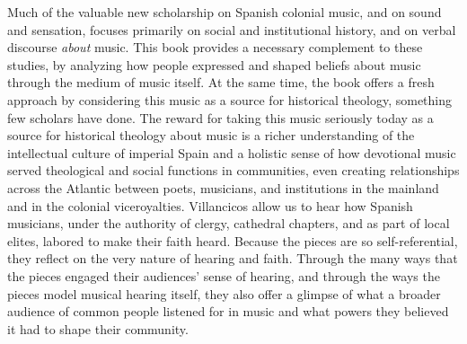 Much of the valuable new scholarship on Spanish colonial music, and on sound and
sensation, focuses primarily on social and institutional history, and on verbal
discourse \emph{about} music.%
    \Autocites{Baker:Harmony}{BakerKnighton:MusicUrbanSociety}{Irving:Colonial} 
    {RamosKittrell:PlayingCathedral}{DellAntonio:Listening}
This book provides a necessary complement to these studies, by analyzing how
people expressed and shaped beliefs about music through the medium of music
itself.
At the same time, the book offers a fresh approach by considering this music as
a source for historical theology, something few scholars have done.
The reward for taking this music seriously today as a source for historical
theology about music is a richer understanding of the intellectual culture of
imperial Spain and a holistic sense of how devotional music served theological
and social functions in communities, even creating relationships across the
Atlantic between poets, musicians, and institutions in the mainland and in
the colonial viceroyalties.
Villancicos allow us to hear how Spanish musicians, under the authority of
clergy, cathedral chapters, and as part of local elites, labored to make their
faith heard.
Because the pieces are so self-referential, they reflect on the very nature of
hearing and faith.
Through the many ways that the pieces engaged their audiences' sense of hearing,
and through the ways the pieces model musical hearing itself, they also offer a
glimpse of what a broader audience of common people listened for in music and
what powers they believed it had to shape their community.

\endinput

\section{Hearing and Communication}

Villancicos were the most widespread form of religious music with words in
vernacular languages in the Catholic world after the Council of Trent, and they
provide evidence for a sustained endeavor by church leaders to establish
conventions of communication with ordinary people.
The creators of villancicos drew on common experiences of everyday life and
linked them to the sacred in inventive ways that met the spiritual needs of
specific communities.
Each piece provides a new answer to Christ's question, \quoted{With what can we
compare the kingdom of God, or what parable will we use for it?}
(\scripture{Mk}{4:21}).
Villancicos thus represent a key component of the Spanish church's effort
to use music to make faith appeal to hearing.
They are evidence of the church working to accommodate hearing and train it at
the same time.

